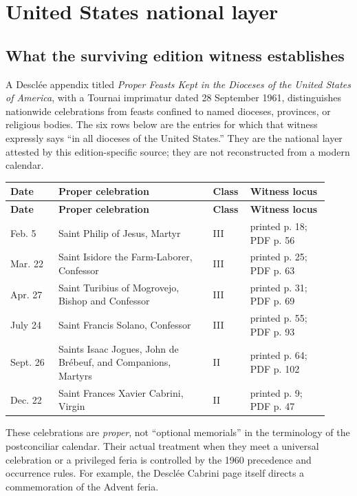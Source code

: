 \section{United States national layer}

\subsection{What the surviving edition witness establishes}

A Desclée appendix titled \emph{Proper Feasts Kept in the Dioceses of the United States of America}, with a Tournai imprimatur dated 28 September 1961, distinguishes nationwide celebrations from feasts confined to named dioceses, provinces, or religious bodies. The six rows below are the entries for which that witness expressly says ``in all dioceses of the United States.'' They are the national layer attested by this edition-specific source; they are not reconstructed from a modern calendar.

\begin{longtable}{@{}p{0.14\linewidth}p{0.45\linewidth}p{0.10\linewidth}p{0.23\linewidth}@{}}
\toprule
\textbf{Date} & \textbf{Proper celebration} & \textbf{Class} & \textbf{Witness locus}\\
\midrule
\endfirsthead
\toprule
\textbf{Date} & \textbf{Proper celebration} & \textbf{Class} & \textbf{Witness locus}\\
\midrule
\endhead
\bottomrule
\endfoot
Feb. 5 & Saint Philip of Jesus, Martyr & III & printed p. 18; PDF p. 56\\
Mar. 22 & Saint Isidore the Farm-Laborer, Confessor & III & printed p. 25; PDF p. 63\\
Apr. 27 & Saint Turibius of Mogrovejo, Bishop and Confessor & III & printed p. 31; PDF p. 69\\
July 24 & Saint Francis Solano, Confessor & III & printed p. 55; PDF p. 93\\
Sept. 26 & Saints Isaac Jogues, John de Brébeuf, and Companions, Martyrs & II & printed p. 64; PDF p. 102\\
Dec. 22 & Saint Frances Xavier Cabrini, Virgin & II & printed p. 9; PDF p. 47\\
\end{longtable}

These celebrations are \emph{proper}, not ``optional memorials'' in the terminology of the postconciliar calendar. Their actual treatment when they meet a universal celebration or a privileged feria is controlled by the 1960 precedence and occurrence rules. For example, the Desclée Cabrini page itself directs a commemoration of the Advent feria.


